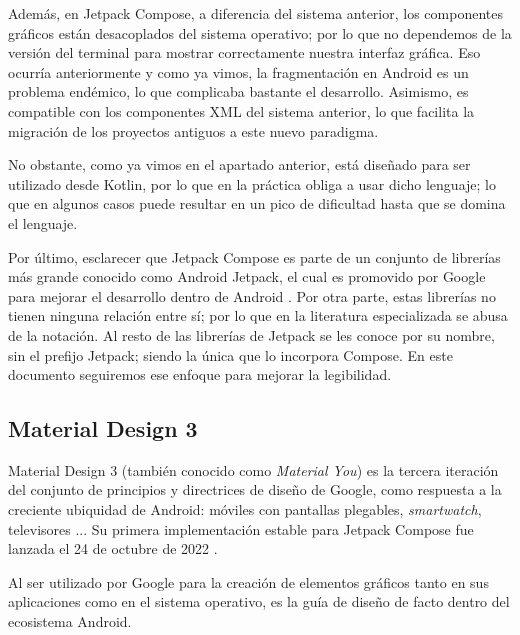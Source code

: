             Además, en Jetpack Compose, a diferencia del sistema anterior, los componentes gráficos están desacoplados 
            del sistema operativo; por lo que no dependemos de la versión del terminal para mostrar correctamente 
            nuestra interfaz gráfica. Eso ocurría anteriormente y como ya vimos, la fragmentación en Android es un 
            problema endémico, lo que complicaba bastante el desarrollo. Asimismo, es compatible con los componentes XML 
            del sistema anterior, lo que facilita la migración de los proyectos antiguos a este nuevo paradigma. 

            No obstante, como ya vimos en el apartado anterior, está diseñado para ser utilizado desde Kotlin, por lo 
            que en la práctica obliga a usar dicho lenguaje; lo que en algunos casos puede resultar en un pico de 
            dificultad hasta que se domina el lenguaje.

            Por último, esclarecer que Jetpack Compose es parte de un conjunto de librerías más grande conocido como 
            Android Jetpack, el cual es promovido por Google para mejorar el desarrollo dentro de Android 
            \cite{huaman_que_2018} \cite{noauthor_recursos_nodate}. Por otra
            parte, estas librerías no tienen ninguna relación entre sí; por lo que en la literatura especializada se 
            abusa de la notación. Al resto de las librerías de Jetpack se les conoce
            por su nombre, sin el prefijo Jetpack; siendo la única que lo incorpora Compose. En este documento 
            seguiremos ese enfoque para mejorar la legibilidad.
        
        \subsection{Material Design 3}
            Material Design 3 (también conocido como \textit{Material You}) es la tercera iteración del 
            conjunto de principios y directrices de diseño de Google, 
            como respuesta a la creciente ubiquidad de Android: móviles con pantallas
            plegables, \textit{smartwatch}, televisores \cite{ramirez_que_2022}... 
            Su primera implementación estable para Jetpack Compose fue lanzada el 
            24 de octubre de 2022 \cite{singh_material_2022}.
            
            Al ser utilizado por Google para la creación de elementos 
            gráficos tanto en sus aplicaciones como en el sistema operativo, es la guía de diseño de facto dentro del
            ecosistema Android.

